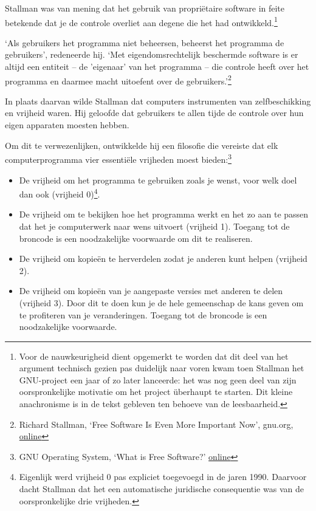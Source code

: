 \documentclass[
  a5paper,
  smalldemyvopaper,11pt,twoside,onecolumn,openright,extrafontsizes]{memoir}
\begin{document}
Stallman was van mening dat het gebruik van propriëtaire software in
feite betekende dat je de controle overliet aan degene die het had
ontwikkeld.\footnote{Voor de nauwkeurigheid dient opgemerkt te worden
  dat dit deel van het argument technisch gezien pas duidelijk naar
  voren kwam toen Stallman het GNU-project een jaar of zo later
  lanceerde: het was nog geen deel van zijn oorspronkelijke motivatie om
  het project überhaupt te starten. Dit kleine anachronisme is in de
  tekst gebleven ten behoeve van de leesbaarheid.}

`Als gebruikers het programma niet beheersen, beheerst het programma de
gebruikers', redeneerde hij. `Met eigendomsrechtelijk beschermde
software is er altijd een entiteit -- de 'eigenaar' van het programma --
die controle heeft over het programma en daarmee macht uitoefent over de
gebruikers.'\footnote{\hspace{0pt}Richard Stallman, `Free Software Is
  Even More Important Now', gnu.org,
  \href{https://www.gnu.org/philosophy/free-software-even-more-important.en.html}{online}}

In plaats daarvan wilde Stallman dat computers instrumenten van
zelfbeschikking en vrijheid waren. Hij geloofde dat gebruikers te allen
tijde de controle over hun eigen apparaten moesten hebben.

Om dit te verwezenlijken, ontwikkelde hij een filosofie die vereiste dat
elk computerprogramma vier essentiële vrijheden moest bieden:\footnote{\hspace{0pt}GNU
  Operating System, `What is Free Software?'
  \href{https://www.gnu.org/philosophy/free-sw.html}{online}}

\begin{itemize}
\item
  De vrijheid om het programma te gebruiken zoals je wenst, voor welk
  doel dan ook (vrijheid 0)\footnote{Eigenlijk werd vrijheid 0 pas
    expliciet toegevoegd in de jaren 1990. Daarvoor dacht Stallman dat
    het een automatische juridische consequentie was van de
    oorspronkelijke drie vrijheden.}.
\item
  De vrijheid om te bekijken hoe het programma werkt en het zo aan te
  passen dat het je computerwerk naar wens uitvoert (vrijheid 1).
  Toegang tot de broncode is een noodzakelijke voorwaarde om dit te
  realiseren.
\item
  De vrijheid om kopieën te herverdelen zodat je anderen kunt helpen
  (vrijheid 2).
\item
  De vrijheid om kopieën van je aangepaste versies met anderen te delen
  (vrijheid 3). Door dit te doen kun je de hele gemeenschap de kans
  geven om te profiteren van je veranderingen. Toegang tot de broncode
  is een noodzakelijke voorwaarde.
\end{itemize}
\end{document}

